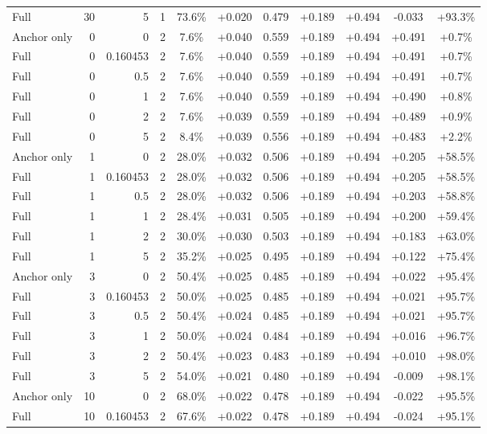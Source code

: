 \begin{table}[htbp]
\begin{tabular}{lrrrccccccc}
Full & 30 & 5 & 1 & 73.6\% & +0.020 & 0.479 & +0.189 & +0.494 & -0.033 & +93.3\% \\
Anchor only & 0 & 0 & 2 & 7.6\% & +0.040 & 0.559 & +0.189 & +0.494 & +0.491 & +0.7\% \\
Full & 0 & 0.160453 & 2 & 7.6\% & +0.040 & 0.559 & +0.189 & +0.494 & +0.491 & +0.7\% \\
Full & 0 & 0.5 & 2 & 7.6\% & +0.040 & 0.559 & +0.189 & +0.494 & +0.491 & +0.7\% \\
Full & 0 & 1 & 2 & 7.6\% & +0.040 & 0.559 & +0.189 & +0.494 & +0.490 & +0.8\% \\
Full & 0 & 2 & 2 & 7.6\% & +0.039 & 0.559 & +0.189 & +0.494 & +0.489 & +0.9\% \\
Full & 0 & 5 & 2 & 8.4\% & +0.039 & 0.556 & +0.189 & +0.494 & +0.483 & +2.2\% \\
Anchor only & 1 & 0 & 2 & 28.0\% & +0.032 & 0.506 & +0.189 & +0.494 & +0.205 & +58.5\% \\
Full & 1 & 0.160453 & 2 & 28.0\% & +0.032 & 0.506 & +0.189 & +0.494 & +0.205 & +58.5\% \\
Full & 1 & 0.5 & 2 & 28.0\% & +0.032 & 0.506 & +0.189 & +0.494 & +0.203 & +58.8\% \\
Full & 1 & 1 & 2 & 28.4\% & +0.031 & 0.505 & +0.189 & +0.494 & +0.200 & +59.4\% \\
Full & 1 & 2 & 2 & 30.0\% & +0.030 & 0.503 & +0.189 & +0.494 & +0.183 & +63.0\% \\
Full & 1 & 5 & 2 & 35.2\% & +0.025 & 0.495 & +0.189 & +0.494 & +0.122 & +75.4\% \\
Anchor only & 3 & 0 & 2 & 50.4\% & +0.025 & 0.485 & +0.189 & +0.494 & +0.022 & +95.4\% \\
Full & 3 & 0.160453 & 2 & 50.0\% & +0.025 & 0.485 & +0.189 & +0.494 & +0.021 & +95.7\% \\
Full & 3 & 0.5 & 2 & 50.4\% & +0.024 & 0.485 & +0.189 & +0.494 & +0.021 & +95.7\% \\
Full & 3 & 1 & 2 & 50.0\% & +0.024 & 0.484 & +0.189 & +0.494 & +0.016 & +96.7\% \\
Full & 3 & 2 & 2 & 50.4\% & +0.023 & 0.483 & +0.189 & +0.494 & +0.010 & +98.0\% \\
Full & 3 & 5 & 2 & 54.0\% & +0.021 & 0.480 & +0.189 & +0.494 & -0.009 & +98.1\% \\
Anchor only & 10 & 0 & 2 & 68.0\% & +0.022 & 0.478 & +0.189 & +0.494 & -0.022 & +95.5\% \\
Full & 10 & 0.160453 & 2 & 67.6\% & +0.022 & 0.478 & +0.189 & +0.494 & -0.024 & +95.1\% \\

\end{tabular}
\end{table}
